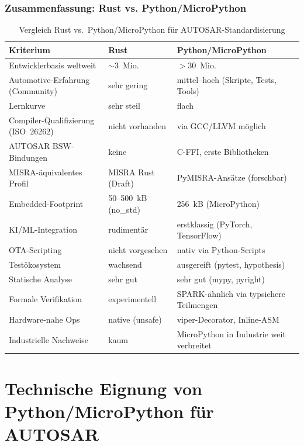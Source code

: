 ﻿\documentclass[12pt,a4paper,twoside]{article}
\begin{document}
\subsubsection{Zusammenfassung: Rust vs. Python/MicroPython}

\begin{table}[h]
\centering
\caption{Vergleich Rust vs.\ Python/MicroPython für AUTOSAR-Standardisierung}
\label{tab:rust_vs_python}
\begin{tabularx}{\textwidth}{lXX}
\toprule
\textbf{Kriterium} & \textbf{Rust} & \textbf{Python/MicroPython} \\
\midrule
Entwicklerbasis weltweit & $\sim$3~Mio. & $>$30~Mio. \\
Automotive-Erfahrung (Community) & sehr gering & mittel--hoch (Skripte, Tests, Tools) \\
Lernkurve & sehr steil & flach \\
Compiler-Qualifizierung (ISO~26262) & nicht vorhanden & via GCC/LLVM möglich \\
AUTOSAR BSW-Bindungen & keine & C-FFI, erste Bibliotheken \\
MISRA-äquivalentes Profil & MISRA Rust (Draft) & PyMISRA-Ansätze (forschbar) \\
Embedded-Footprint & 50--500~kB (no\_std) & 256~kB (MicroPython) \\
KI/ML-Integration & rudimentär & erstklassig (PyTorch, TensorFlow) \\
OTA-Scripting & nicht vorgesehen & nativ via Python-Scripts \\
Testökosystem & wachsend & ausgereift (pytest, hypothesis) \\
Statische Analyse & sehr gut & sehr gut (mypy, pyright) \\
Formale Verifikation & experimentell & SPARK-ähnlich via typsichere Teilmengen \\
Hardware-nahe Ops & native (unsafe) & viper-Decorator, Inline-ASM \\
Industrielle Nachweise & kaum & MicroPython in Industrie weit verbreitet \\
\bottomrule
\end{tabularx}
\end{table}

\section{Technische Eignung von Python/MicroPython für AUTOSAR}
\label{sec:technische_eignung}
\end{document}
